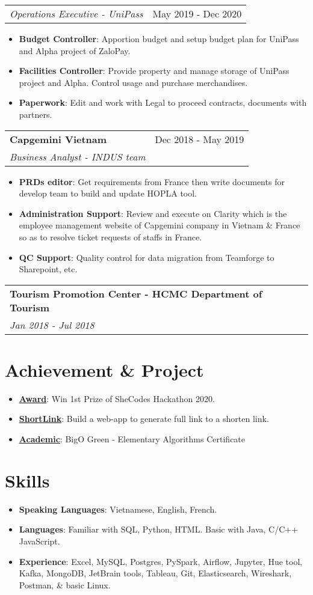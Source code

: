 \documentclass[letterpaper,11pt]{article}
\makeatletter
\newcommand{\resumeItem}[2]{
  \item\small{
    \textbf{#1}{: #2 \vspace{-2pt}}
  }
}
\newcommand{\resumeSubheading}[4]{
  \vspace{-1pt}
  \item
    \begin{tabular*}{0.97\textwidth}{l@{\extracolsep{\fill}}r}
      \textbf{#1} & #2 \\
      \textit{\small#3} & \textit{\small #4} \\
    \end{tabular*}\vspace{-5pt}
}
\newcommand{\resumeSubheadingNoTitle}[2]{
  \vspace{-1pt}
    \begin{tabular*}{0.97\textwidth}{l@{\extracolsep{\fill}}r}
      \textit{\small#1} & #2 \\
    \end{tabular*}\vspace{-5pt}
}
\newcommand{\resumeSubItem}[2]{\resumeItem{#1}{#2}\vspace{-4pt}}
\newcommand{\resumeSubHeadingListStart}{\begin{itemize}[leftmargin=*]}
\newcommand{\resumeSubHeadingListEnd}{\end{itemize}}
\newcommand{\resumeItemListStart}{\begin{itemize}}
\newcommand{\resumeItemListEnd}{\end{itemize}\vspace{-5pt}}
\makeatother
\begin{document}
    \resumeSubheadingNoTitle
      {Operations Executive - UniPass}{May 2019 - Dec 2020}
      \resumeItemListStart
        \resumeItem{Budget Controller}
          {Apportion budget and setup budget plan for UniPass and Alpha project of ZaloPay.} 
        \resumeItem{Facilities Controller}
          {Provide property and manage storage of UniPass project and Alpha. Control usage and purchase merchandises.}
        \resumeItem{Paperwork}
          {Edit and work with Legal to proceed contracts, documents with partners. }
      \resumeItemListEnd
      
    \resumeSubheading
      {Capgemini Vietnam}{Dec 2018 - May 2019}
      {Business Analyst - INDUS team}{}
      \resumeItemListStart
        \resumeItem{PRDs editor}
          {Get requirements from France then write documents for develop team to build and update HOPLA tool.} 
        \resumeItem{Administration Support}
            {Review and execute on Clarity which is the employee management website of Capgemini company in Vietnam \& France so as to resolve ticket requests of staffs in France. }
        \resumeItem{QC Support}    
            {Quality control for data migration from Teamforge to Sharepoint, etc. }
      \resumeItemListEnd


    \resumeSubheading
      {Tourism Promotion Center - HCMC Department of Tourism}{}{Jan 2018 - Jul 2018}
  \resumeSubHeadingListEnd
  
  
\section{Achievement \& Project}
  \resumeSubHeadingListStart 
    \resumeSubItem{\href{}{Award}}
      {Win 1st Prize of SheCodes Hackathon 2020. }
    \resumeSubItem{\href{https://github.com/tuyen-nnt/shortenLink}{ShortLink}}
      {Build a web-app to generate full link to a shorten link.}
    \resumeSubItem{\href{}{Academic}}
      {BigO Green - Elementary Algorithms Certificate}
\resumeSubHeadingListEnd

  
\section{Skills}
  \resumeSubHeadingListStart
    \resumeSubItem{Speaking Languages}
      {Vietnamese, English, French.}
    \resumeSubItem{Languages}
      {Familiar with SQL, Python, HTML. Basic with Java, C/C++ JavaScript.}
    \resumeSubItem{Experience}
      {Excel, MySQL, Postgres, PySpark, Airflow, Jupyter, Hue tool, Kafka, MongoDB, JetBrain tools, Tableau, Git, Elasticsearch, Wireshark, Postman, \& basic Linux.}
\resumeSubHeadingListEnd
  
\end{document}
